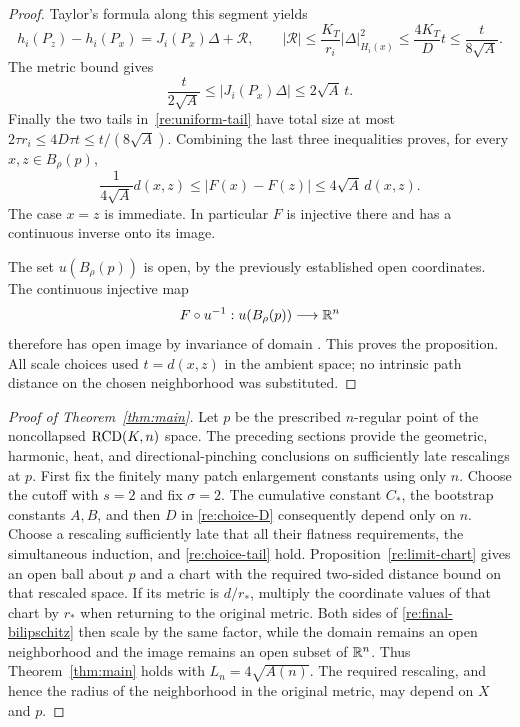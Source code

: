 \begin{proof}
Taylor's formula along this segment yields
\[
 h_i(P_z)-h_i(P_x)=J_i(P_x)\Delta+\mathcal R,
 \qquad
 |\mathcal R|\le\frac{K_T}{r_i}|\Delta|_{H_i(x)}^2
       \le\frac{4K_T}{D}t\le\frac{t}{8\sqrt A}.
\]
The metric bound gives
\[
 \frac{t}{2\sqrt A}\le|J_i(P_x)\Delta|\le2\sqrt A\,t.
\]
Finally the two tails in~\eqref{re:uniform-tail} have total size at
most $2\tau r_i\le4D\tau t\le t/(8\sqrt A)$.  Combining the
last three inequalities proves, for every $x,z\in B_\rho(p)$,
\begin{equation}
 \label{re:final-bilipschitz}
 \frac{1}{4\sqrt A}d(x,z)
       \le|F(x)-F(z)|\le4\sqrt A\,d(x,z).
\end{equation}
The case $x=z$ is immediate.  In particular $F$ is injective there
and has a continuous inverse onto its image.

The set $u(B_\rho(p))$ is open, by the previously established open
coordinates.  The continuous injective map
\[
 F\circ u^{-1}:u(B_\rho(p))\longrightarrow\mathbb R^n
\]
therefore has open image by invariance of domain
\cite[Theorem~2B.3]{Hatcher02}. This proves the
proposition.  All scale choices used $t=d(x,z)$ in the ambient space;
no intrinsic path distance on the chosen neighborhood was substituted.
\end{proof}

\begin{proof}[Proof of Theorem~\ref{thm:main}]
Let $p$ be the prescribed $n$-regular point of the noncollapsed
$\mathrm{RCD}(K,n)$ space.  The preceding sections provide the geometric,
harmonic, heat, and directional-pinching conclusions on sufficiently
late rescalings at $p$.  First fix the finitely many patch enlargement
constants using only $n$. Choose the cutoff with $s=2$ and fix
$\sigma=2$. The cumulative constant $C_*$, the bootstrap constants
$A,B$, and then $D$ in \eqref{re:choice-D} consequently depend only
on $n$. Choose a rescaling sufficiently late that all
their flatness requirements, the simultaneous induction, and
\eqref{re:choice-tail} hold.  Proposition~\ref{re:limit-chart} gives
an open ball about $p$ and a chart with the required two-sided
distance bound on that rescaled space.  If its metric is $d/r_*$,
multiply the coordinate values of that chart by $r_*$ when returning
to the original metric.  Both sides of
\eqref{re:final-bilipschitz} then scale by the same factor, while
the domain remains an open neighborhood and the image remains an
open subset of $\mathbb R^n$. Thus Theorem~\ref{thm:main} holds with
$L_n=4\sqrt{A(n)}$. The required rescaling, and hence the radius
of the neighborhood in the original metric, may depend on $X$ and $p$.
\end{proof}
